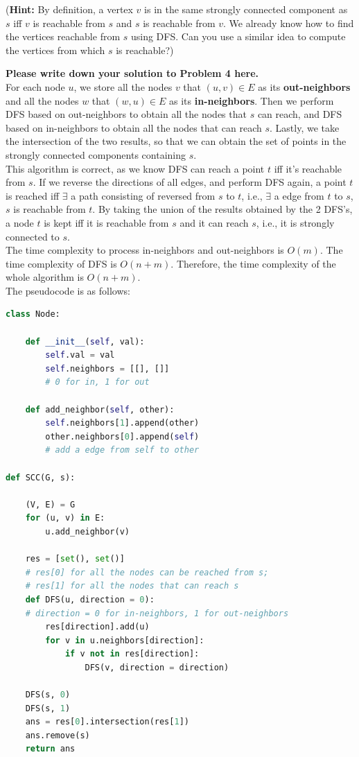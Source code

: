 \documentclass[11pt,twoside]{article}
\newenvironment{solution}{{\par\noindent\it Solution.}}{}
\begin{document}
(\textbf{Hint:} By definition, a vertex $v$ is in the same strongly connected component as $s$ iff $v$ is reachable from $s$ and $s$ is reachable from $v$. We already know how to find the vertices reachable from $s$ using DFS. Can you use a similar idea to compute the vertices from which $s$ is reachable?)

\begin{solution}
\textbf{Please write down your solution to Problem 4 here.}
\vspace{10pt}\\
For each node $u$, we store all the nodes $v$ that $(u,v)\in E$ as its \textbf{out-neighbors} and all the nodes $w$ that $(w,u)\in E$ as its \textbf{in-neighbors}.
Then we perform DFS based on out-neighbors to obtain all the nodes that $s$ can reach, and DFS based on in-neighbors to obtain all the nodes that can reach $s$.
Lastly, we take the intersection of the two results, so that we can obtain the set of points in the strongly connected components containing $s$.
\vspace{10pt}\\
This algorithm is correct, as we know DFS can reach a point $t$ iff it's reachable from $s$. 
If we reverse the directions of all edges, and perform DFS again, a point $t$ is reached iff $\exists$ a path consisting of reversed from $s$ to $t$,
i.e., $\exists$ a edge from $t$ to $s$, $s$ is reachable from $t$. By taking the union of the results obtained by the 2 DFS's, 
a node $t$ is kept iff it is reachable from $s$ and it can reach $s$, i.e., it is strongly connected to $s$.
\vspace{10pt}\\
The time complexity to process in-neighbors and out-neighbors is $O(m)$. The time complexity of DFS is $O(n+m)$. Therefore, the time complexity of the whole algorithm is $O(n+m)$.
\vspace{10pt}\\
The pseudocode is as follows:
\begin{lstlisting}[language=Python]
class Node:

    def __init__(self, val):
        self.val = val
        self.neighbors = [[], []]
        # 0 for in, 1 for out

    def add_neighbor(self, other):
        self.neighbors[1].append(other)
        other.neighbors[0].append(self)
        # add a edge from self to other

def SCC(G, s):

    (V, E) = G
    for (u, v) in E:
        u.add_neighbor(v)
    
    res = [set(), set()]
    # res[0] for all the nodes can be reached from s;
    # res[1] for all the nodes that can reach s
    def DFS(u, direction = 0):
    # direction = 0 for in-neighbors, 1 for out-neighbors
        res[direction].add(u)
        for v in u.neighbors[direction]:
            if v not in res[direction]:
                DFS(v, direction = direction)
    
    DFS(s, 0)
    DFS(s, 1)
    ans = res[0].intersection(res[1])
    ans.remove(s)
    return ans
\end{lstlisting}
\end{solution}
\end{document}

